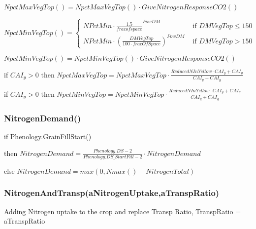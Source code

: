 \documentclass[%
]{scrartcl}
\newcommand\mymarginpar[1]{\marginpar {\flushleft\bfseries\scriptsize #1}}
\begin{document}
	$NpctMaxVegTop() = NpctMaxVegTop()  \cdot  GiveNitrogenResponseCO2()$
 
  $ NpctMinVegTop() =
  \begin{cases}
  NPctMin  \cdot  \frac{1.5}{fracofspace}^{PowDM}  & \text{ if $DMVegTop \le 150$}  \\   
  	 NPctMin  \cdot  \left(\tfrac{DMVegTop}{100  \cdot  fracOfSpace}\right)^{PowDM}  & \text{ if $DMVegTop > 150$} 
	\end{cases}$
 
  $NpctMinVegTop() = NpctMinVegTop()  \cdot  GiveNitrogenResponseCO2()$
  
  if $CAI_y > 0$ then  
  $NpctMaxVegTop =  NpctMaxVegTop  \cdot  \tfrac{ReducedNInYellow  \cdot  CAI_y + CAI_g}{CAI_y + CAI_g} $

  if $CAI_y > 0$ then  
  $NpctMinVegTop =  NpctMinVegTop  \cdot  \tfrac{ReducedNInYellow  \cdot  CAI_y + CAI_g}{CAI_y + CAI_g} $



\subsubsection*{NitrogenDemand()} \mymarginpar{DS\_StartFill}
 	
 	if Phenology.GrainFillStart() 
 	
 	then 	$NitrogenDemand = \tfrac{Phenology.DS-2}{Phenology.DS\_StartFill-2}  \cdot  NitrogenDemand $ 		
 	
 	else 	$NitrogenDemand= max(0,Nmax()-NitrogenTotal)$ 
  
\subsubsection*{NitrogenAndTransp(aNitrogenUptake,aTranspRatio)}
Adding Nitrogen uptake to the crop and replace Transp Ratio,
   TranspRatio = aTranspRatio
   
\end{document}
